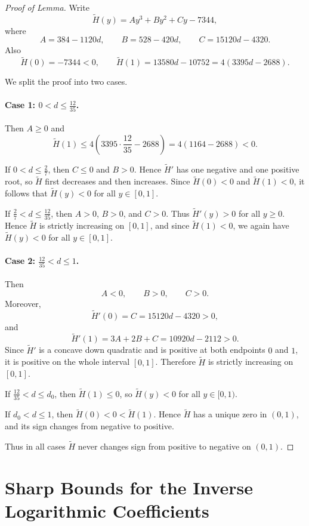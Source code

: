 \documentclass[11pt,reqno]{amsart}
\numberwithin{equation}{section}
\begin{document}
\begin{proof}[Proof of Lemma]
Write
\[
\widetilde H(y)=A y^3+B y^2+C y-7344,
\]
where
\[
A=384-1120d,\qquad B=528-420d,\qquad C=15120d-4320.
\]
Also
\[
\widetilde H(0)=-7344<0,
\qquad
\widetilde H(1)=13580d-10752
=4(3395d-2688).
\]

We split the proof into two cases.

\paragraph{Case 1: $0<d\le \frac{12}{35}$.}
Then $A\ge0$ and
\[
\widetilde H(1)\le 4\left(3395\cdot \frac{12}{35}-2688\right)
=4(1164-2688)<0.
\]

If $0<d\le \frac27$, then $C\le0$ and $B>0$. Hence $\widetilde H'$ has one negative and one positive root, so $\widetilde H$ first decreases and then increases. Since $\widetilde H(0)<0$ and $\widetilde H(1)<0$, it follows that $\widetilde H(y)<0$ for all $y\in[0,1]$.

If $\frac27<d\le \frac{12}{35}$, then $A>0$, $B>0$, and $C>0$. Thus $\widetilde H'(y)>0$ for all $y\ge0$. Hence $\widetilde H$ is strictly increasing on $[0,1]$, and since $\widetilde H(1)<0$, we again have $\widetilde H(y)<0$ for all $y\in[0,1]$.

\paragraph{Case 2: $\frac{12}{35}<d\le1$.}
Then
\[
A<0,\qquad B>0,\qquad C>0.
\]
Moreover,
\[
\widetilde H'(0)=C=15120d-4320>0,
\]
and
\[
\widetilde H'(1)=3A+2B+C=10920d-2112>0.
\]
Since $\widetilde H'$ is a concave down quadratic and is positive at both endpoints $0$ and $1$, it is positive on the whole interval $[0,1]$. Therefore $\widetilde H$ is strictly increasing on $[0,1]$.

If $\frac{12}{35}<d\le d_0$, then $\widetilde H(1)\le0$, so $\widetilde H(y)<0$ for all $y\in[0,1)$.

If $d_0<d\le1$, then $\widetilde H(0)<0<\widetilde H(1)$. Hence $\widetilde H$ has a unique zero in $(0,1)$, and its sign changes from negative to positive.

Thus in all cases $\widetilde H$ never changes sign from positive to negative on $(0,1)$.
\end{proof}



\section{Sharp Bounds for the Inverse Logarithmic Coefficients}
\end{document}
